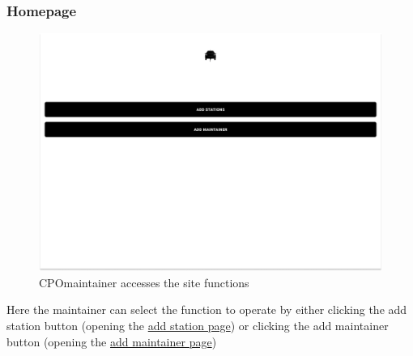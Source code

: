 \subsubsection{Homepage}
\begin{figure}[H]
    \centering
    \includegraphics[keepaspectratio, width=15cm]{Mockup/CPMSSiteInterface/Homepage.png}
    \caption{\ac{CPO}maintainer accesses the site functions}
    \label{cpo:Homepage}
\end{figure}
Here the maintainer can select the function to operate by either clicking the add station button (opening the \hyperref[cpo:Station]{add station page}) or clicking the add maintainer button (opening the \hyperref[cpo:Maintainer]{add maintainer page})

